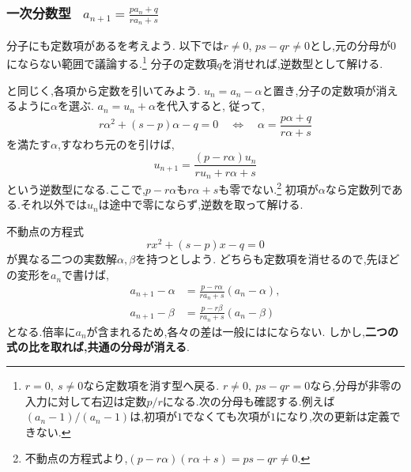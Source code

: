 
\subsubsection{\texorpdfstring{一次分数型  \, $\displaystyle a_{n+1}=\frac{pa_n+q}{ra_n+s}$}{一次分数型}}\label{節：1次分数型}
    分子にも定数項があるを考えよう.
    以下では$r\ne0$, $ps-qr\ne0$とし,元の分母が$0$にならない範囲で議論する.\footnote{$r=0,\ s\ne0$なら定数項を消す型へ戻る.
    $r\ne0,\ ps-qr=0$なら,分母が非零の入力に対して右辺は定数$p/r$になる.次の分母も確認する.例えば$(a_n-1)/(a_n-1)$は,初項が$1$でなくても次項が$1$になり,次の更新は定義できない.}
    分子の定数項$q$を消せれば,逆数型として解ける.

    と同じく,各項から定数を引いてみよう.
    $u_n=a_n-\alpha$と置き,分子の定数項が消えるように$\alpha$を選ぶ.
    $a_n=u_n+\alpha$を代入すると,
    従って,
    \[
      r\alpha^2+(s-p)\alpha-q=0
      \quad\Longleftrightarrow\quad
      \alpha=\frac{p\alpha+q}{r\alpha+s}
    \]
    を満たす$\alpha$,すなわち元のを引けば,
    \[
      u_{n+1}=\frac{(p-r\alpha)u_n}{ru_n+r\alpha+s}
    \]
    という逆数型になる.ここで,$p-r\alpha$も$r\alpha+s$も零でない.\footnote{不動点の方程式より,$(p-r\alpha)(r\alpha+s)=ps-qr\ne0$.}
    初項が$\alpha$なら定数列である.それ以外では$u_n$は途中で零にならず,逆数を取って解ける.

    不動点の方程式
    \[
      rx^2+(s-p)x-q=0
    \]
    が異なる二つの実数解$\alpha,\beta$を持つとしよう.
    どちらも定数項を消せるので,先ほどの変形を$a_n$で書けば,
    \begin{align*}
      a_{n+1}-\alpha
      &=\frac{p-r\alpha}{ra_n+s}(a_n-\alpha),\\
      a_{n+1}-\beta
      &=\frac{p-r\beta}{ra_n+s}(a_n-\beta)
    \end{align*}
    となる.倍率に$a_n$が含まれるため,各々の差は一般にはにならない.
    しかし,\textbf{二つの式の比を取れば,共通の分母が消える}.

